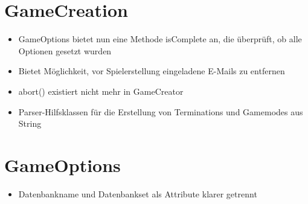 \documentclass[a4paper]{scrreprt}
\begin{document}
\section{GameCreation}
\begin{itemize}
    \item GameOptions bietet nun eine Methode isComplete an, die überprüft, ob alle Optionen gesetzt wurden
    \item Bietet Möglichkeit, vor Spielerstellung eingeladene E-Mails zu entfernen
    \item abort() existiert nicht mehr in GameCreator
    \item Parser-Hilfsklassen für die Erstellung von Terminations und Gamemodes aus String
\end{itemize}

\section{GameOptions}
\begin{itemize}
    \item Datenbankname und Datenbankset als Attribute klarer getrennt
\end{itemize}
\end{document}
